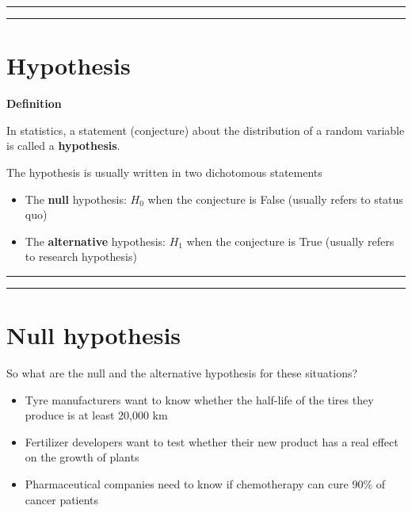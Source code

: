 \documentclass[
]{book}
\providecommand{\tightlist}{%
  \setlength{\itemsep}{0pt}\setlength{\parskip}{0pt}}
\begin{document}
\begin{center}\rule{0.5\linewidth}{0.5pt}\end{center}

\begin{center}\rule{0.5\linewidth}{0.5pt}\end{center}

\hypertarget{hypothesis-4}{%
\section{Hypothesis}\label{hypothesis-4}}

\textbf{Definition}

In statistics, a statement (conjecture) about the distribution of a random variable is called a \textbf{hypothesis}.

The hypothesis is usually written in two dichotomous statements

\begin{itemize}
\tightlist
\item
  The \textbf{null} hypothesis: \(H_0\) when the conjecture is False (usually refers to status quo)
\item
  The \textbf{alternative} hypothesis: \(H_1\) when the conjecture is True (usually refers to research hypothesis)
\end{itemize}

\begin{center}\rule{0.5\linewidth}{0.5pt}\end{center}

\begin{center}\rule{0.5\linewidth}{0.5pt}\end{center}

\hypertarget{null-hypothesis}{%
\section{Null hypothesis}\label{null-hypothesis}}

So what are the null and the alternative hypothesis for these situations?

\begin{itemize}
\item
  Tyre manufacturers want to know whether the half-life of the tires they produce is at least 20,000 km
\item
  Fertilizer developers want to test whether their new product has a real effect on the growth of plants
\item
  Pharmaceutical companies need to know if chemotherapy can cure 90\% of cancer patients
\end{itemize}
\end{document}
